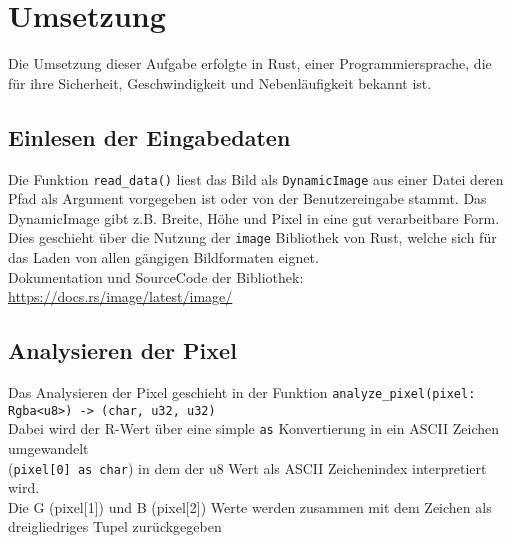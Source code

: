 \section{Umsetzung}
Die Umsetzung dieser Aufgabe erfolgte in Rust, einer Programmiersprache, die für ihre Sicherheit, Geschwindigkeit und Nebenläufigkeit bekannt ist.

\subsection{Einlesen der Eingabedaten}
Die Funktion \texttt{read\_data()} liest das Bild als \texttt{DynamicImage} aus einer Datei deren Pfad als Argument vorgegeben ist oder von der Benutzereingabe stammt.
Das DynamicImage gibt z.B. Breite, Höhe und Pixel in eine gut verarbeitbare Form.\\
Dies geschieht über die Nutzung der \texttt{image} Bibliothek von Rust, welche sich für das Laden von allen gängigen Bildformaten eignet.\\
Dokumentation und SourceCode der Bibliothek: \url{https://docs.rs/image/latest/image/}

\subsection{Analysieren der Pixel}\label{sec:pixel analysis}

Das Analysieren der Pixel geschieht in der Funktion \texttt{analyze\_pixel(pixel: Rgba<u8>) -> (char, u32, u32)}\\
Dabei wird der R-Wert über eine simple \texttt{as} Konvertierung in ein ASCII Zeichen umgewandelt\\
(\texttt{pixel[0] as char})
in dem der u8 Wert als ASCII Zeichenindex interpretiert wird.\\
Die G (pixel[1]) und B (pixel[2]) Werte werden zusammen mit dem Zeichen als dreigliedriges Tupel zurückgegeben

